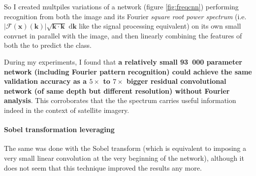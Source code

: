 \documentclass{article}
\newcommand{\vect}[1]{\mathbf{#1}}
\begin{document}
So I created multpiles variations of a network (figure \ref{fig:freqcnn}) performing recognition from both the image and its Fourier \emph{square root power spectrum} (i.e. $|\mathcal{F}(\vect{x})(\vect{k})|  \sqrt{\vect{k} \cdot \vect{k}} \, \, \mathrm{d} \vect{k}$ like the signal processing equivalent) on its own small convnet in parallel with the image, and then linearly combining the  features of both the  to predict the class.


During my experiments, I found that \textbf{a relatively small 93~000 parameter network (including Fourier pattern recognition) could achieve the same  validation accuracy as a $5 \times$ to $7\times$ bigger residual convolutional network (of same depth but different resolution) without Fourier analysis}. This corroborates that the the spectrum  carries useful information indeed in the context of satellite imagery.

\paragraph{Sobel transformation leveraging} 
The same was done with the Sobel transform (which is equivalent to imposing  a very small linear convolution at the very beginning of the network), although it does not seem that this technique improved the results any more. 
\end{document}
